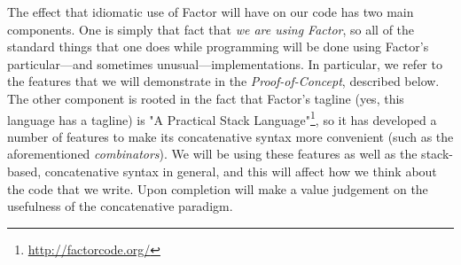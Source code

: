 \documentclass{sig-alternate}
\begin{document}
The effect that idiomatic use of Factor will have on our code has two main components. One is simply that fact that \textit{we are using Factor}, so all of the standard things that one does while programming will be done using Factor's particular---and sometimes unusual---implementations. In particular, we refer to the features that we will demonstrate in the \textit{Proof-of-Concept}, described below. The other component is rooted in the fact that Factor's tagline (yes, this language has a tagline) is "A Practical Stack Language"\footnote{\url{http://factorcode.org/}}, so it has developed a number of features to make its concatenative syntax more convenient (such as the aforementioned \textit{combinators}). We will be using these features as well as the stack-based, concatenative syntax in general, and this will affect how we think about the code that we write. Upon completion will make a value judgement on the usefulness of the concatenative paradigm.
\end{document}

